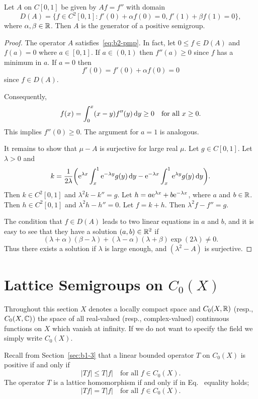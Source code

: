 \begin{example}\label{ex:b2-1.24}
Let $A$ on $C[0,1]$ be given by $Af = f''$ with domain 
\[
D(A) = \{f \in C^{2}[0,1] \colon f'(0) + \alpha f(0) = 0, f'(1) + \beta f(1) = 0\},
\]
where $\alpha,\beta \in \mathbb{R}$.
Then $A$ is the generator of a positive semigroup.
\end{example}
\begin{proof}
The operator $A$ satisfies~\eqref{eq:b2-pmp}.
In fact, let $0 \leq f \in D(A)$ and $f(a) = 0$ where $a \in [0,1]$.
If\/ $a \in (0,1)$ then $f''(a) \geq 0$ since $f$ has a minimum in $a$.
If\/ $a = 0$ then 
\[
f'(0) = f'(0) + \alpha f(0) = 0
\]
since $f \in D(A)$.

Consequently, 
%
\[
	f(x) = \int_{0}^{x} (x-y)f''(y) \dy \geq 0 
	\quad \text{for all $x \geq 0$.}
\]
%
This implies $f''(0) \geq 0$.
The argument for $a = 1$ is analogous.

It remains to show that $\mu - A$ is surjective for large real $\mu$.
Let $g \in C[0,1]$.
Let $\lambda > 0$ and 
\[k = \frac{1}{2\lambda}\mleft( \eu^{\lambda x}\int_{x}^{1} \eu^{-\lambda y}g(y)\dy - \eu^{-\lambda x}\int_{x}^{1} \eu^{\lambda y}g(y)\dy \mright).
\]
Then $k \in C^{2}[0,1]$ and $\lambda^{2}k - k'' = g$.
Let $h = a\mathrm{e}^{\lambda x} + b\mathrm{e}^{-\lambda x}$, where $a$ and $b \in \mathbb{R}$.
Then $h \in C^{2}[0,1]$ and $\lambda^{2}h - h'' = 0$.
Let $f = k + h$.
Then $\lambda^{2}f - f'' = g$.

The condition that $f \in D(A)$ leads to two linear equations in $a$ and $b$, and it is easy to see that they have a solution $(a,b) \in \mathbb{R}^{2}$ if\/ 
%
\[
	 (\lambda+\alpha)(\beta-\lambda) + (\lambda-\alpha)(\lambda+\beta)\exp(2\lambda) \neq 0 .
\]
%
Thus there exists a solution if\/ $\lambda$ is large enough, and $(\lambda^{2} - A)$ is surjective.
\end{proof}
\section{Lattice Semigroups on  \texorpdfstring{$C_{0}(X)$}{C₀(X)}}\label{sec:b2-2}%
Throughout this section $X$ denotes a locally compact space and $C_{0}(X,\mathbb{R})$ (resp., $C_{0}(X,\mathbb{C})$) the space of all real-valued (resp., complex-valued) continuous functions on $X$ which vanish at infinity.
If we do not want to specify the field we simply write $C_{0}(X)$.

Recall from  Section~\ref{sec:b1-3} that a linear bounded operator $T$ on $C_{0}(X)$ is positive if and only if
\begin{equation}\label{eq:b2-2.1}
|Tf| \leq T|f| \quad \text{for all } f \in C_{0}(X).
\end{equation}
The operator $T$ is a lattice homomorphism if and only if in Eq.~ equality holds; \ie 
\begin{equation}\label{eq:b2-2.2}
|Tf| = T|f| \quad \text{for all } f \in C_{0}(X).
\end{equation}

